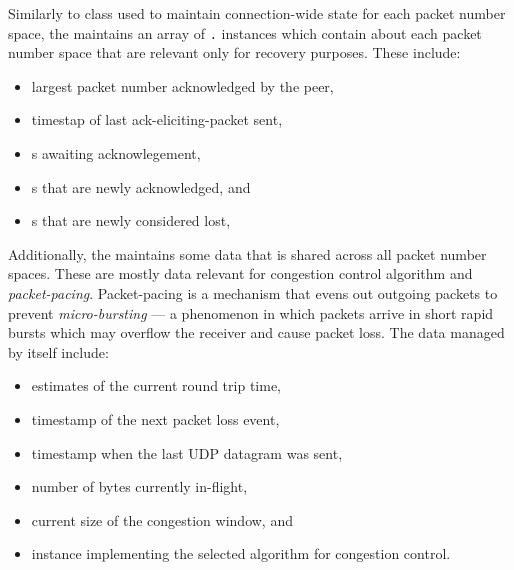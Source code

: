 Similarly to \PacketNumberSpace{} class used to maintain connection-wide state for each packet
number space, the \RecoveryController{} maintains an array of
\texttt{\RecoveryController{}.\PacketNumberSpace{}} instances which contain about each packet number
space that are relevant only for recovery purposes. These include:

\begin{itemize}

  \item largest packet number acknowledged by the peer,

  \item timestap of last \gls{ack-eliciting-packet} sent,

  \item \SentPacket{}s awaiting acknowlegement,

  \item \SentPacket{}s that are newly acknowledged, and

  \item \SentPacket{}s that are newly considered lost,

\end{itemize}

Additionally, the \RecoveryController{} maintains some data that is shared across all packet number
spaces. These are mostly data relevant for congestion control algorithm and
\textit{\gls{packet-pacing}}. Packet-pacing is a mechanism that evens out outgoing packets to
prevent \textit{\gls{micro-bursting}} --- a phenomenon in which packets arrive in short rapid bursts which may
overflow the receiver and cause packet loss. The data managed by \RecoveryController{}
itself include:

\begin{itemize}

  \item estimates of the current round trip time,

  \item timestamp of the next packet loss event,

  \item timestamp when the last UDP datagram was sent,

  \item number of bytes currently in-flight,

  \item current size of the congestion window, and

  \item \ICongestionController{} instance implementing the selected algorithm for congestion control.

\end{itemize}

